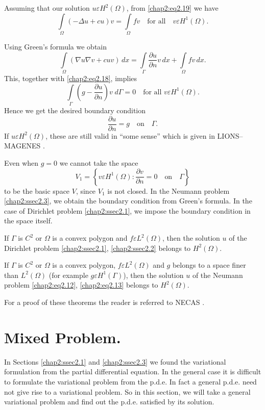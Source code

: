 Assuming that our solution $u\varepsilon H^2(\Omega)$, from
\eqref{chap2:eq2.19} we have 
$$
\int\limits_\Omega(-\Delta u+cu)v=\int\limits_\Omega fv\quad\text{for
all}\quad v\varepsilon H^1(\Omega).
$$

Using Green's formula we obtain
$$
\int\limits_\Omega(\nabla u\nabla v+cuv)\,dx= \int\limits_\Gamma
\frac{\partial u}{\partial n}v\,dx+\int\limits_\Omega fv\,dx.
$$
This, together with \eqref{chap2:eq2.18}, implies
$$
\int\limits_\Gamma\left(g-\frac{\partial u}{\partial n}\right)v\; d\Gamma =0
\quad\text{for all } v\varepsilon H^1(\Omega).
$$
Hence we get the desired boundary condition
$$
\frac{\partial u}{\partial n}=g\quad\text{on}\quad \Gamma.
$$
If $u\varepsilon H^2(\Omega)$, these are still valid in ``some sense''
which is given in LIONS--MAGENES \cite{key29}.

\begin{REM}\label{chap2:rem2}
Even when $g=0$ we cannot take the space
$$
V_1=\left\{v\varepsilon H^1(\Omega):\frac{\partial v}{\partial n}=0
\quad\text{on}\quad\Gamma\right\}
$$\pageoriginale
to be the basic space $V$, since $V_1$ is not closed. In the Neumann
problem \ref{chap2:ssec2.3}, we obtain the boundary condition from
Green's formula. In the case of Dirichlet problem \ref{chap2:ssec2.1},
we impose the boundary condition in the space itself.
\end{REM}

\setcounter{dirichlet}{1}
\begin{dirichlet}\label{chap2:THM2}
If $\Gamma$ is $C^2$ or $\Omega$ is a convex polygon and $f\varepsilon
L^2(\Omega)$, then the solution $u$ of the Dirichlet problem
\eqref{chap2:ssec2.1}, \eqref{chap2:ssec2.2} belongs to $H^2(\Omega)$. 
\end{dirichlet}

\setcounter{neumann}{2}
\begin{neumann}\label{chap2:THM3}
If $\Gamma$ is $C^2$ or $\Omega$ is a convex polygon, $f\varepsilon
L^2(\Omega)$ and $g$ belongs to a space finer than $L^2(\Omega)$ (for
example $g\varepsilon H^1(\Gamma)$), then the solution $u$ of the
Neumann problem \eqref{chap2:eq2.12}, \eqref{chap2:eq2.13} belongs to
$H^2(\Omega)$. 
\end{neumann}

For a proof of these theorems the reader is referred to NECAS \cite{key33}.

\section{Mixed Problem.}\label{chap2:ssec2.4} In Sections
\ref{chap2:ssec2.1} and
\ref{chap2:ssec2.3} we found the variational formulation from the
partial differential equation. In the general case it is difficult to
formulate the variational problem from the p.d.e. In fact a general
p.d.e. need not give rise to a variational problem. So in this
section, we will take a general variational problem and find out the
p.d.e. satisfied by its solution.

